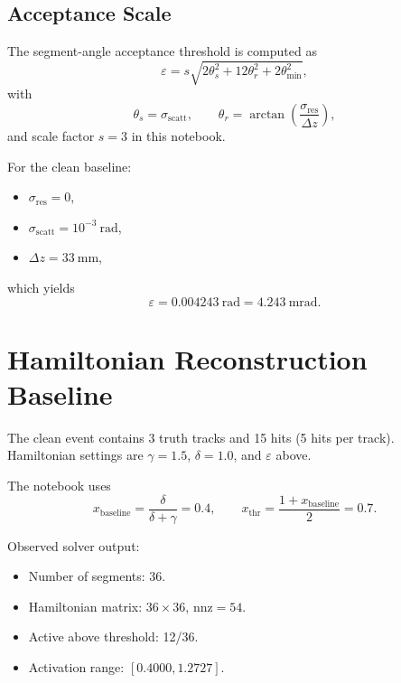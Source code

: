 \documentclass[11pt,a4paper]{article}
\begin{document}
\subsection{Acceptance Scale}
The segment-angle acceptance threshold is computed as
\begin{equation}
\varepsilon = s\sqrt{2\theta_s^2 + 12\theta_r^2 + 2\theta_{\min}^2},
\end{equation}
with
\begin{equation}
\theta_s = \sigma_{\mathrm{scatt}},
\qquad
\theta_r = \arctan\left(\frac{\sigma_{\mathrm{res}}}{\Delta z}\right),
\end{equation}
and scale factor \(s=3\) in this notebook.

For the clean baseline:
\begin{itemize}[leftmargin=1.5em]
  \item \(\sigma_{\mathrm{res}} = 0\),
  \item \(\sigma_{\mathrm{scatt}} = 10^{-3}~\mathrm{rad}\),
  \item \(\Delta z = 33~\mathrm{mm}\),
\end{itemize}
which yields
\begin{equation}
\varepsilon = 0.004243~\mathrm{rad} = 4.243~\mathrm{mrad}.
\end{equation}

\section{Hamiltonian Reconstruction Baseline}
The clean event contains 3 truth tracks and 15 hits (5 hits per track).
Hamiltonian settings are
\(\gamma=1.5\), \(\delta=1.0\), and \(\varepsilon\) above.

The notebook uses
\begin{equation}
x_{\mathrm{baseline}} = \frac{\delta}{\delta+\gamma} = 0.4,
\qquad
x_{\mathrm{thr}} = \frac{1 + x_{\mathrm{baseline}}}{2} = 0.7.
\end{equation}

Observed solver output:
\begin{itemize}[leftmargin=1.5em]
  \item Number of segments: 36.
  \item Hamiltonian matrix: \(36\times 36\), \(\mathrm{nnz}=54\).
  \item Active above threshold: 12/36.
  \item Activation range: \([0.4000, 1.2727]\).
\end{itemize}
\end{document}
